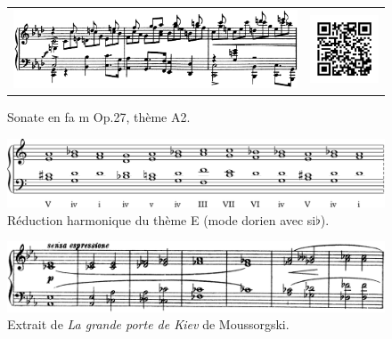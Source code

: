 \begin{figure}[!p]
  \begin{bigcenter}
    \begin{tabular}{lr}
      \includegraphics[width=12.5cm, keepaspectratio]{sonate-theme-A2.png}
      &
      \includegraphics[width=3cm, keepaspectratio]{op1-qr.png}
    \end{tabular}
  \end{bigcenter}
  \caption{\label{sonate-theme-12}Sonate en fa m Op.27, thème A2.}
\end{figure}

\begin{figure}[!p]
  \begin{bigcenter}
    \includegraphics[width=15cm, keepaspectratio]{religioso.pdf}
  \end{bigcenter}
  \caption{\label{sonate-theme-5-reduction}Réduction harmonique du thème E (mode dorien avec si$\flat$).}
\end{figure}

\begin{figure}[!ht]
  \begin{bigcenter}
    \includegraphics[width=15cm, keepaspectratio]{kiev.png}
  \end{bigcenter}
  \caption{\label{grande-porte-de-kiev}Extrait de \emph{La grande porte de Kiev} de Moussorgski.}
\end{figure}

